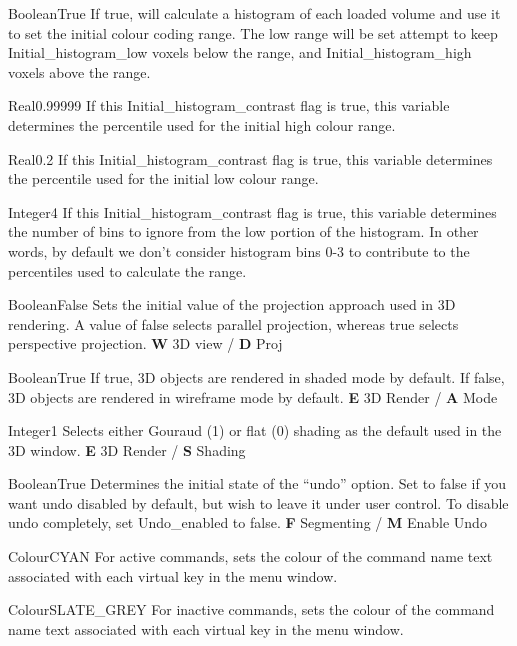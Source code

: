 {Boolean}{True}
{If true, \display{} will calculate a histogram of each loaded volume
  and use it to set the initial colour coding range. The low range will
  be set attempt to keep Initial\_histogram\_low voxels below the range,
  and Initial\_histogram\_high voxels above the range.}{}

{Real}{0.99999}
{If this Initial\_histogram\_contrast flag is true, this variable
  determines the percentile used for the initial high colour range.}{}

{Real}{0.2}
{If this Initial\_histogram\_contrast flag is true, this variable
  determines the percentile used for the initial low colour range.}{}

{Integer}{4}
{If this Initial\_histogram\_contrast flag is true, this variable
 determines the number of bins to ignore from the low portion of the 
histogram. In other words, by default we don't consider histogram bins
0-3 to contribute to the percentiles used to calculate the range.}{}

{Boolean}{False}
{Sets the initial value of the projection approach used in 3D rendering. A value of false selects parallel projection, whereas true selects perspective projection.}
{{\bf W} 3D view / {\bf D} Proj}

{Boolean}{True}
{If true, 3D objects are rendered in shaded mode by default. If false, 3D objects are rendered in wireframe mode by default.}
{{\bf E} 3D Render / {\bf A} Mode}

{Integer}{1}
{Selects either Gouraud (1) or flat (0) shading as the default used in the 3D window.}
{{\bf E} 3D Render / {\bf S} Shading}

{Boolean}{True}
{Determines the initial state of the ``undo'' option. Set to false if you want undo disabled by default, but wish to leave it under user control. To disable undo completely, set Undo\_enabled to false.}
{{\bf F} Segmenting / {\bf M} Enable Undo}

 {Colour}{CYAN}
{For active commands, sets the colour of the command name text
  associated with each virtual key in the menu window.}{}

 {Colour}{SLATE\_GREY}
{For inactive commands, sets the colour of the command name text
  associated with each virtual key in the menu window.}{}

